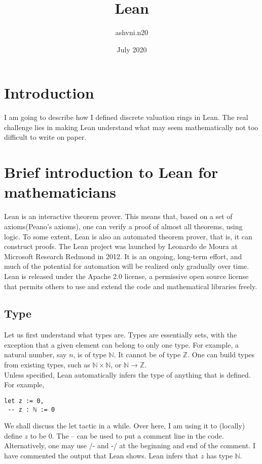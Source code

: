 \documentclass[10pt, a4paper]{article}
\title{Lean}
\author{ashvni.n20 }
\date{July 2020}
\begin{document}
\maketitle

\tableofcontents

\section{Introduction}
I am going to describe how I defined discrete valuation rings in Lean. The real challenge lies in making Lean understand what may seem mathematically not too difficult to write on paper.

\section{Brief introduction to Lean for mathematicians}
Lean is an interactive theorem prover. This means that, based on a set of axioms(Peano's axioms), one can verify a proof of almost all theorems, using logic. To some extent, Lean is also an automated theorem prover, that is, it can construct proofs. The Lean project was launched by Leonardo de Moura at Microsoft Research Redmond
in 2012. It is an ongoing, long-term effort, and much of the potential for automation
will be realized only gradually over time. Lean is released under the Apache 2.0 license,
a permissive open source license that permits others to use and extend the code and
mathematical libraries freely. 

\subsection{Type}
Let us first understand what types are. Types are essentially sets, with the exception that a given element can belong to only one type. For example, a natural number, say $n$, is of type $\mathbb{N}$. It cannot be of type $\mathbb{Z}$. One can build types from existing types, such as $\mathbb{N} \times \mathbb{N}$, or $\mathbb{N} \to \mathbb{Z}$. \\

Unless specified, Lean automatically infers the type of anything that is defined. For example, 

\begin{lstlisting}
let z := 0,
 -- z : ℕ := 0
\end{lstlisting}

We shall discuss the let tactic in a while. Over here, I am using it to (locally) define $z$ to be 0. The -- can be used to put a comment line in the code. Alternatively, one may use /- and -/ at the beginning and end of the comment. I have commented the output that Lean shows. Lean infers that $z$ has type $\mathbb{N}$. \\
\end{document}
